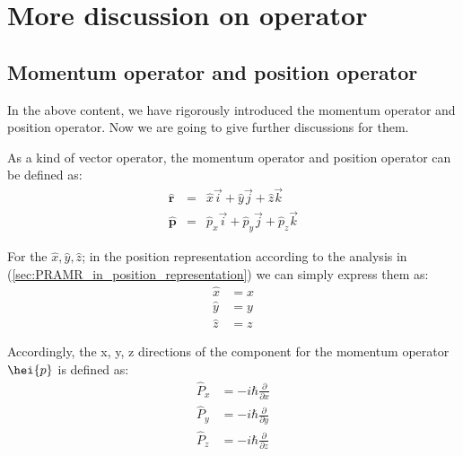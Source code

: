 %
%
%
%

\chapter{More discussion on operator}
%
%
\section{Momentum operator and position operator}
%
%
%
In the above content, we have rigorously introduced the momentum
operator and position operator. Now we are going to give further
discussions for them.

As a kind of vector operator, the momentum operator and position
operator can be defined as:
\begin{eqnarray}
  \mathbf{\hat{r}} &=& \hat{x}\overrightarrow{i} + \hat{y}\overrightarrow{j} + \hat{z}\overrightarrow{k} \nonumber \\
  \mathbf{\hat{p}} &=& \hat{p}_{x}\overrightarrow{i} + \hat{p}_{y}\overrightarrow{j} + \hat{p}_{z}\overrightarrow{k}
\end{eqnarray}

For the $\hat{x}, \hat{y}, \hat{z}$; in the position representation
according to the analysis in
(\ref{sec:PRAMR_in_position_representation}) we can simply express
them as:
\begin{align}\label{OPERATORMOREeq:14}
\hat{x} &= x \nonumber \\
\hat{y} &= y \nonumber \\
\hat{z} &= z
\end{align}

Accordingly, the x, y, z directions of the component for the
momentum operator $\hei{p}$ is defined as:
\begin{align}\label{OPERATORMOREeq:13}
\hat{P}_{x} &= -i\hbar\frac{\partial}{\partial x}   \nonumber \\
\hat{P}_{y} &= -i\hbar\frac{\partial}{\partial y}   \nonumber \\
\hat{P}_{z} &= -i\hbar\frac{\partial}{\partial z}
\end{align}

